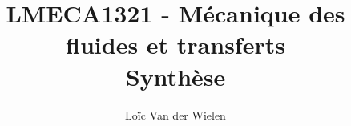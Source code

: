 \documentclass[a4paper,11pt]{report}
\title{LMECA1321 - Mécanique des fluides et transferts\\Synthèse}
\author{Loïc Van der Wielen}
\begin{document}
\maketitle
\tableofcontents





\begin{appendix}
  
\end{appendix}
\end{document}
